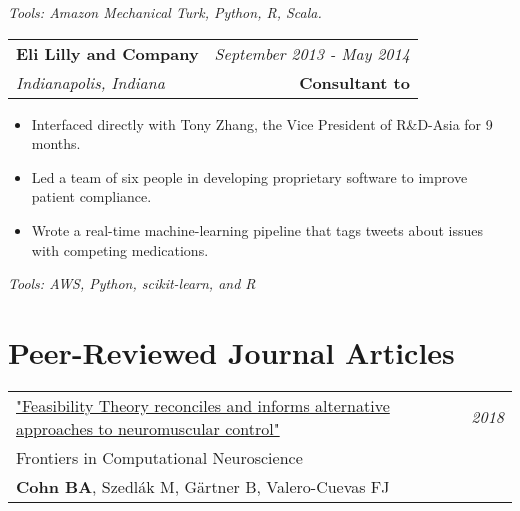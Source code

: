 \documentclass[10pt,a4paper]{article}
\begin{document}
  \vspace*{2mm}\setlength\parindent{2mm}\begin{minipage}{16.8cm}
    \textit{Tools: Amazon Mechanical Turk, Python, R, Scala.}
  \end{minipage}

  \vspace*{3mm}\noindent\begin{tabularx}{17cm}{X r}
    \textbf{Eli Lilly and Company} & \textit{September 2013 - May 2014} \\
    \textit{Indianapolis, Indiana} & \textbf{Consultant to} 
  \end{tabularx}

  \vspace*{1mm}\noindent\begin{minipage}{17cm}
    \begin{itemize}[leftmargin=6mm,topsep=0mm,itemsep=-1mm]
      \item Interfaced directly with Tony Zhang, the Vice President of R\&D-Asia for 9 months.
      \item Led a team of six people in developing proprietary software to improve patient compliance.
      \item Wrote a real-time machine-learning pipeline that tags tweets about issues with competing medications.
    \end{itemize}
  \end{minipage}

  \vspace*{2mm}\setlength\parindent{2mm}\begin{minipage}{16.8cm}
    \textit{Tools: AWS, Python, scikit-learn, and R} 
  \end{minipage}




  \vspace*{3mm}\section*{Peer-Reviewed Journal Articles} 

\vspace*{1mm}\noindent\begin{tabularx}{17cm}{X r}
   \href{https://github.com/bc/resume/raw/master/papers/cohn_et_al_2018_frontiers.pdf}{"Feasibility Theory reconciles and informs alternative approaches to neuromuscular control"} & \textit{2018}\\
   Frontiers in Computational Neuroscience \\
	 \textbf{Cohn BA}, Szedl\'{a}k M, G{\"a}rtner B, Valero-Cuevas FJ \\[2mm]
\end{tabularx}
\end{document}
